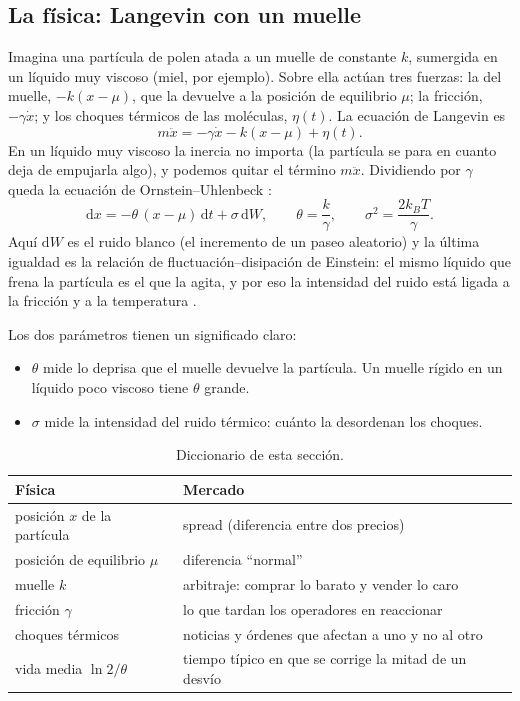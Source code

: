 \documentclass[11pt,a4paper]{article}
\newcommand{\dd}{\mathrm{d}}
\begin{document}
\subsection{La física: Langevin con un muelle}

Imagina una partícula de polen atada a un muelle de constante $k$, sumergida en un líquido muy viscoso
(miel, por ejemplo). Sobre ella actúan tres fuerzas: la del muelle, $-k(x-\mu)$, que la devuelve a la
posición de equilibrio $\mu$; la fricción, $-\gamma\dot x$; y los choques térmicos de las moléculas,
$\eta(t)$. La ecuación de Langevin es
\begin{equation}
m\ddot x=-\gamma\dot x-k(x-\mu)+\eta(t) .
\end{equation}
En un líquido muy viscoso la inercia no importa (la partícula se para en cuanto deja de empujarla algo), y
podemos quitar el término $m\ddot x$. Dividiendo por $\gamma$ queda la ecuación de Ornstein--Uhlenbeck
\cite{uhlenbeck1930}:
\begin{equation}
\dd x=-\theta\,(x-\mu)\,\dd t+\sigma\,\dd W,\qquad \theta=\frac{k}{\gamma},\qquad
\sigma^2=\frac{2k_BT}{\gamma}.
\label{eq:ou}
\end{equation}
Aquí $\dd W$ es el ruido blanco (el incremento de un paseo aleatorio) y la última igualdad es la relación
de fluctuación--disipación de Einstein: el mismo líquido que frena la partícula es el que la agita, y por
eso la intensidad del ruido está ligada a la fricción y a la temperatura \cite{uam_me4,gardiner2009}.

Los dos parámetros tienen un significado claro:
\begin{itemize}
\item $\theta$ mide lo deprisa que el muelle devuelve la partícula. Un muelle rígido en un líquido poco
viscoso tiene $\theta$ grande.
\item $\sigma$ mide la intensidad del ruido térmico: cuánto la desordenan los choques.
\end{itemize}

\begin{table}[ht]
\centering\small
\caption{Diccionario de esta sección.}
\begin{tabular}{@{}ll@{}}
\toprule
Física & Mercado \\
\midrule
posición $x$ de la partícula & spread (diferencia entre dos precios)\\
posición de equilibrio $\mu$ & diferencia ``normal''\\
muelle $k$ & arbitraje: comprar lo barato y vender lo caro\\
fricción $\gamma$ & lo que tardan los operadores en reaccionar\\
choques térmicos & noticias y órdenes que afectan a uno y no al otro\\
vida media $\ln2/\theta$ & tiempo típico en que se corrige la mitad de un desvío\\
\bottomrule
\end{tabular}
\end{table}
\end{document}
